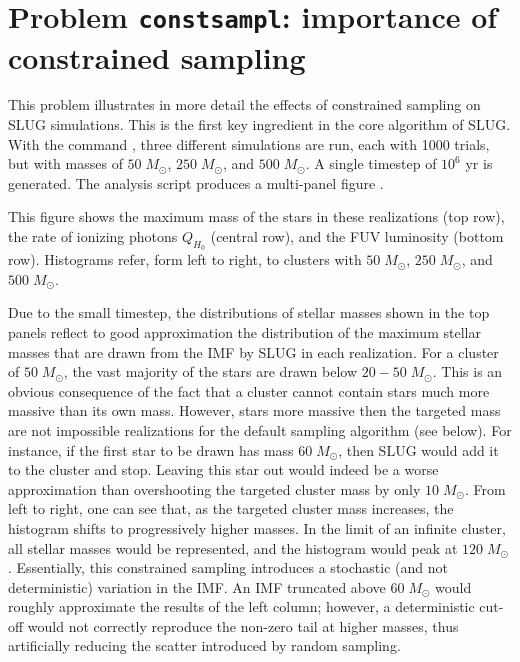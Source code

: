 \documentclass[letterpaper,10pt,english]{sphinxmanual}
\begin{document}
\section{Problem \texttt{constsampl}: importance of constrained sampling}
\label{tests:probsampl-label}\label{tests:problem-constsampl-importance-of-constrained-sampling}
This problem illustrates in more detail the effects of constrained sampling on SLUG simulations.
This is the first key ingredient in the core algorithm of SLUG. With the command ,
three different  simulations are run, each with 1000 trials, but with masses of \(50\;M_\odot\),
\(250\;M_\odot\), and \(500\;M_\odot\). A single timestep of \(10^6\) yr is generated.
The analysis script  produces a multi-panel
figure .

This figure shows the maximum mass of the stars in these realizations (top row), the
rate of ionizing photons \(Q_{H_0}\) (central row), and the FUV luminosity (bottom row).
Histograms refer, form left to right, to clusters with \(50\;M_\odot\), \(250\;M_\odot\),
and \(500\;M_\odot\).

Due to the small timestep, the distributions of stellar masses shown in the top panels reflect
to good approximation the distribution of the maximum stellar masses that are drawn from the IMF by
SLUG in each realization. For a cluster of \(50\;M_\odot\), the vast majority of the
stars are drawn below  \(20-50\;M_\odot\). This is an obvious consequence of the
fact that a cluster cannot contain stars much more massive than its own mass. However, stars
more massive then the targeted mass are not impossible realizations for the default
sampling algorithm (see below). For instance, if the first star to be drawn has
mass \(60\;M_\odot\), then SLUG would add it to the cluster and stop. Leaving this star out
would indeed be a worse approximation than overshooting the targeted cluster mass by only
\(10\;M_\odot\).  From left to right, one can see that, as the targeted cluster mass increases, the
histogram shifts to progressively higher masses. In the limit of an infinite cluster,
all stellar masses would be represented, and the histogram would peak at \(120\;M_\odot\).
Essentially, this constrained sampling introduces a stochastic (and not deterministic)
variation in the IMF. An IMF truncated above \(60\;M_\odot\) would roughly
approximate the results of the left column; however, a deterministic cut-off
would not correctly reproduce the non-zero tail at higher masses, thus artificially
reducing the scatter introduced by random sampling.
\end{document}
